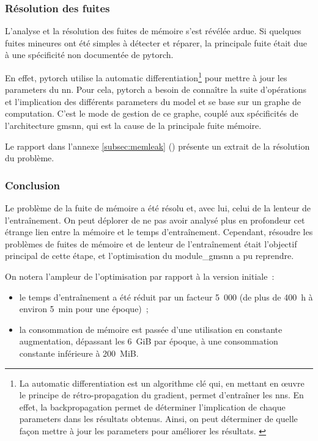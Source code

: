\subsubsection{Résolution des fuites}
L'analyse et la résolution des fuites de mémoire s'est révélée ardue. Si quelques fuites mineures ont été simples à détecter et réparer, la principale fuite était due à une spécificité non documentée de \gls{pytorch}.

En effet, \gls{pytorch} utilise la \gls{automatic differentiation}\footnote{
	La \gls{automatic differentiation} est un algorithme clé qui, en mettant en œuvre le principe de rétro-propagation du gradient, permet d'entraîner les \glspl{nn}.
	En effet, la \gls{backpropagation} permet de déterminer l'implication de chaque  \glspl{parameter} dans les résultats obtenus.
	Ainsi, on peut déterminer de quelle façon mettre à jour les \glspl{parameter} pour améliorer les résultats. \label{def:automatic differentiation} \label{def:backpropagation}}
pour mettre à jour les \glspl{parameter} du \gls{nn}.
Pour cela, \gls{pytorch} a besoin de connaître la suite d'opérations et l'implication des différents \glspl{parameter} du \gls{model} et se base sur un \og graphe de computation\fg{}.
C'est le mode de gestion de ce graphe, couplé aux spécificités de l'architecture \gls{gmsnn}, qui est la cause de la principale fuite mémoire.

Le rapport dans l'annexe \ref{subsec:memleak} () présente un extrait de la résolution du problème.

\subsubsection{Conclusion}
Le problème de la fuite de mémoire a été résolu et, avec lui, celui de la lenteur de l'entraînement.
On peut déplorer de ne pas avoir analysé plus en profondeur cet étrange lien entre la mémoire et le temps d'entraînement.
Cependant, résoudre les problèmes de fuites de mémoire et de lenteur de l'entraînement était l'objectif principal de cette étape, et l'optimisation du \gls{module_gmsnn} a pu reprendre.

On notera l'ampleur de l'optimisation par rapport à la version initiale~:
\begin{itemize}
	\item le temps d'entraînement a été réduit par un facteur 5~000 (de plus de 400~h à environ 5~min pour une époque)~;
	\item la consommation de mémoire est passée d'une utilisation en constante augmentation, dépassant les 6~GiB par époque, à une consommation constante inférieure à 200~MiB.
\end{itemize}\vspace{1em}